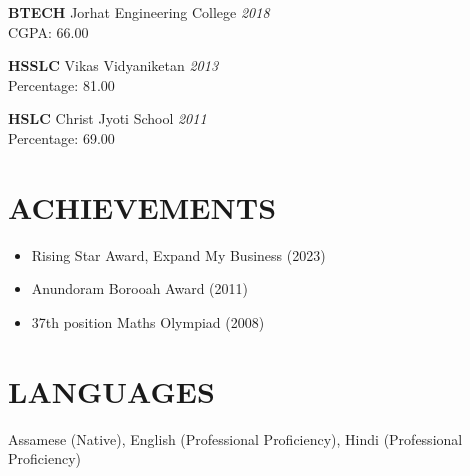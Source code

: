 \documentclass[10pt,a4paper]{article}
\begin{document}
\textbf{BTECH} \hfill Jorhat Engineering College \hfill \textit{2018} \\
CGPA: 66.00
\vspace{2mm}

\textbf{HSSLC} \hfill Vikas Vidyaniketan \hfill \textit{2013} \\
Percentage: 81.00
\vspace{2mm}

\textbf{HSLC} \hfill Christ Jyoti School \hfill \textit{2011} \\
Percentage: 69.00

\section*{ACHIEVEMENTS}
\begin{itemize}[leftmargin=*, itemsep=0pt, topsep=0pt, parsep=0pt]
    \item Rising Star Award, Expand My Business (2023)
    \item Anundoram Borooah Award (2011)
    \item 37th position Maths Olympiad (2008)
\end{itemize}

\section*{LANGUAGES}
Assamese (Native), English (Professional Proficiency), Hindi (Professional Proficiency)
\end{document}
